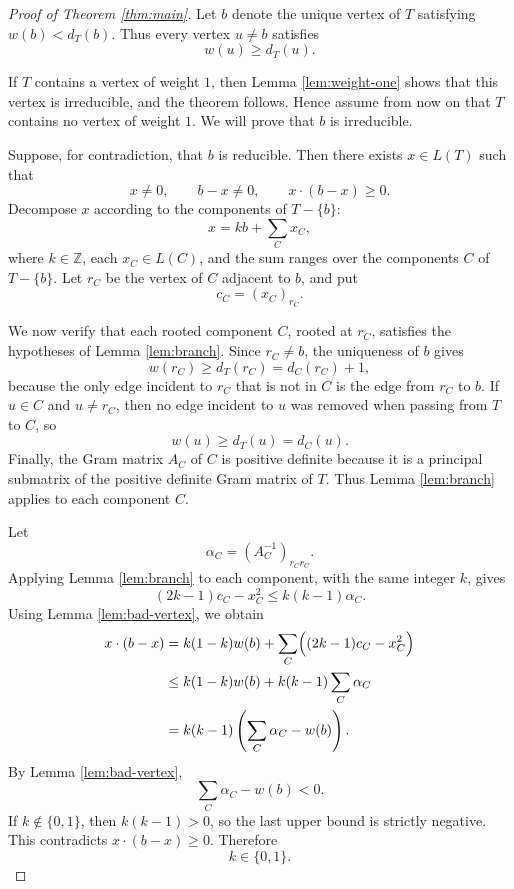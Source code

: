 \documentclass[12pt]{article}
\newcommand{\Z}{\mathbb{Z}}
\begin{document}
\begin{proof}[Proof of Theorem \ref{thm:main}]
Let \(b\) denote the unique vertex of \(T\) satisfying \(w(b)<d_T(b)\). Thus every vertex \(u\ne b\) satisfies
\[
w(u)\ge d_T(u).
\]

If \(T\) contains a vertex of weight \(1\), then Lemma \ref{lem:weight-one} shows that this vertex is irreducible, and the theorem follows. Hence assume from now on that \(T\) contains no vertex of weight \(1\). We will prove that \(b\) is irreducible.

Suppose, for contradiction, that \(b\) is reducible. Then there exists \(x\in L(T)\) such that
\[
x\ne 0,
\qquad
b-x\ne 0,
\qquad
x\cdot(b-x)\ge 0.
\]
Decompose \(x\) according to the components of \(T-\{b\}\):
\[
x=kb+\sum_C x_C,
\]
where \(k\in\Z\), each \(x_C\in L(C)\), and the sum ranges over the components \(C\) of \(T-\{b\}\). Let \(r_C\) be the vertex of \(C\) adjacent to \(b\), and put
\[
c_C=(x_C)_{r_C}.
\]

We now verify that each rooted component \(C\), rooted at \(r_C\), satisfies the hypotheses of Lemma \ref{lem:branch}. Since \(r_C\ne b\), the uniqueness of \(b\) gives
\[
w(r_C)\ge d_T(r_C)=d_C(r_C)+1,
\]
because the only edge incident to \(r_C\) that is not in \(C\) is the edge from \(r_C\) to \(b\). If \(u\in C\) and \(u\ne r_C\), then no edge incident to \(u\) was removed when passing from \(T\) to \(C\), so
\[
w(u)\ge d_T(u)=d_C(u).
\]
Finally, the Gram matrix \(A_C\) of \(C\) is positive definite because it is a principal submatrix of the positive definite Gram matrix of \(T\). Thus Lemma \ref{lem:branch} applies to each component \(C\).

Let
\[
\alpha_C=(A_C^{-1})_{r_Cr_C}.
\]
Applying Lemma \ref{lem:branch} to each component, with the same integer \(k\), gives
\[
(2k-1)c_C-x_C^2\le k(k-1)\alpha_C.
\]
Using Lemma \ref{lem:bad-vertex}, we obtain
\[
\begin{aligned}
x\cdot(b-x)
&=
k(1-k)w(b)
+
\sum_C\Bigl((2k-1)c_C-x_C^2\Bigr)\\
&\le
k(1-k)w(b)+k(k-1)\sum_C\alpha_C\\
&=
k(k-1)\left(\sum_C\alpha_C-w(b)\right).
\end{aligned}
\]
By Lemma \ref{lem:bad-vertex},
\[
\sum_C\alpha_C-w(b)<0.
\]
If \(k\notin\{0,1\}\), then \(k(k-1)>0\), so the last upper bound is strictly negative. This contradicts \(x\cdot(b-x)\ge 0\). Therefore
\[
k\in\{0,1\}.
\]


\end{proof}
\end{document}
